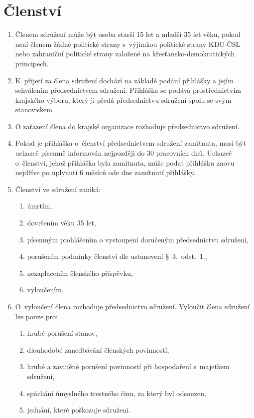 \documentclass[a4paper]{article}
\begin{document}
\section{Členství}
    \begin{enumerate}
    \item Členem sdružení může být osoba starší 15 let a mladší 35 let věku,
        pokud není členem žádné politické strany s~výjimkou politické strany
        KDU-ČSL nebo zahraniční politické strany založené na
        křesťansko-demokratických principech.

    \item K~přijetí za člena sdružení dochází na základě podání přihlášky a
        jejím schválením předsednictvem sdružení. Přihláška se podává
        prostřednictvím krajského výboru, který ji předá předsednictvu
        sdružení spolu se svým stanoviskem.

    \item O zařazení člena do krajské organizace rozhoduje předsednictvo
        sdružení.

    \item Pokud je přihláška o~členství předsednictvem sdružení zamítnuta,
        musí být uchazeč písemně informován nejpozději do 30 pracovních dnů.
        Uchazeč o~členství, jehož přihláška byla zamítnuta, může podat
        přihlášku znovu nejdříve po uplynutí 6 měsíců ode dne zamítnutí
        přihlášky.

    \item Členství ve sdružení zaniká:
        \begin{enumerate}
        \item úmrtím,
        \item dovršením věku 35 let,
        \item písemným prohlášením o vystoupení doručeným předsednictvu
            sdružení,
        \item porušením podmínky členství dle ustanovení \S~3.~odst.~1.,
        \item nezaplacením členského příspěvku,
        \item vyloučením.
        \end{enumerate}

    \item O~vyloučení člena rozhoduje předsednictvo sdružení. Vyloučit člena
        sdružení lze pouze pro:
        \begin{enumerate}
        \item hrubé porušení stanov,
        \item dlouhodobé zanedbávání členských povinností,
        \item hrubé a zaviněné porušení povinností při hospodaření s~majetkem
            sdružení,
        \item spáchání úmyslného trestného činu, za který byl odsouzen,
        \item jednání, které poškozuje sdružení.
        \end{enumerate}


\end{enumerate}
\end{document}
